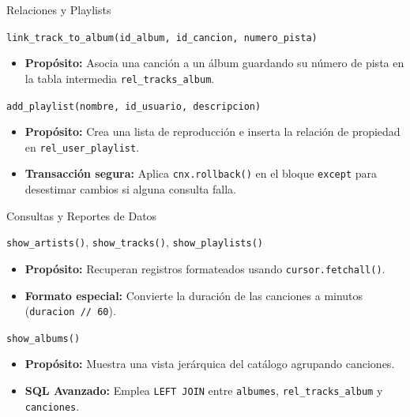 \documentclass[aspectratio=169, 10pt]{beamer}
\begin{document}
\begin{frame}[t]{Relaciones y Playlists}
	\small
	\begin{block}{\texttt{link\_track\_to\_album(id\_album, id\_cancion, numero\_pista)}}
		\begin{itemize}
			\item \textbf{Propósito:} Asocia una canción a un álbum guardando su número de pista en la tabla intermedia \texttt{rel\_tracks\_album}.
		\end{itemize}
	\end{block}
	
	\begin{block}{\texttt{add\_playlist(nombre, id\_usuario, descripcion)}}
		\begin{itemize}
			\item \textbf{Propósito:} Crea una lista de reproducción e inserta la relación de propiedad en \texttt{rel\_user\_playlist}.
			\item \textbf{Transacción segura:} Aplica \texttt{cnx.rollback()} en el bloque \texttt{except} para desestimar cambios si alguna consulta falla.
		\end{itemize}
	\end{block}
\end{frame}

\begin{frame}[t]{Consultas y Reportes de Datos}
	\small
	\begin{block}{\texttt{show\_artists()}, \texttt{show\_tracks()}, \texttt{show\_playlists()}}
		\begin{itemize}
			\item \textbf{Propósito:} Recuperan registros formateados usando \texttt{cursor.fetchall()}.
			\item \textbf{Formato especial:} Convierte la duración de las canciones a minutos (\texttt{duracion // 60}).
		\end{itemize}
	\end{block}
	
	\begin{block}{\texttt{show\_albums()}}
		\begin{itemize}
			\item \textbf{Propósito:} Muestra una vista jerárquica del catálogo agrupando canciones.
			\item \textbf{SQL Avanzado:} Emplea \texttt{LEFT JOIN} entre \texttt{albumes}, \texttt{rel\_tracks\_album} y \texttt{canciones}.
		\end{itemize}
	\end{block}
\end{frame}
\end{document}
